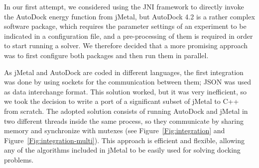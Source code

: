 In our first attempt, we considered using the JNI framework to directly invoke the AutoDock energy function from jMetal, but AutoDock 4.2 is a rather complex software package, which requires the parameter settings of an experiment to be indicated in a configuration file, and a pre-processing of them is required in order to start running a solver. We therefore decided that a more promising approach was to first configure both packages and then run them in parallel.

As jMetal and AutoDock are coded in different languages, the first integration was done by using sockets for the communication between them; JSON was used as data interchange format. This solution worked, but it was very inefficient, so we took the decision to write a port of a significant subset of jMetal to C++ from scratch. The adopted solution consists of running AutoDock and jMetal in two different threads inside the same process, so they communicate by sharing memory and synchronize with mutexes (see Figure~\ref{Fig:integration} and Figure~\ref{Fig:integration-multi}). This approach is efficient and flexible, allowing any of the algorithms included in jMetal to be easily used for solving docking problems.